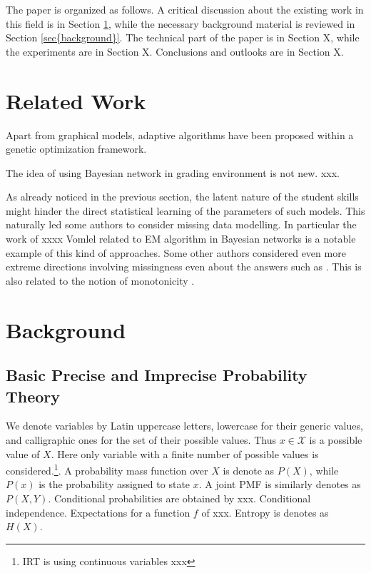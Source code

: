 \documentclass[runningheads]{llncs}
\begin{document}
The paper is organized as follows. A critical discussion about the existing work in this field is in Section \ref{sec:work}, while the necessary background material is reviewed in Section \ref{sec{background}}. The technical part of the paper is in Section X, while the experiments are in Section X. Conclusions and outlooks are in Section X.

\section{Related Work}\label{sec:work}






Apart from graphical models, adaptive algorithms have been proposed within a genetic optimization framework.


The idea of using Bayesian network in grading environment is not new. xxx.

As already noticed in the previous section, the latent nature of the student skills might hinder the direct statistical learning of the parameters of such models. This naturally led some authors to consider missing data modelling. In particular the work of xxxx Vomlel related to EM algorithm in Bayesian networks is a notable example of this kind of approaches. Some other authors considered even more extreme directions involving missingness even about the answers such as \cite{bachrach2012grade}.
This is also related to the notion of monotonicity \cite{plajner2020monotonicity}.


\section{Background}
\subsection*{Basic Precise and Imprecise Probability Theory}
We denote variables by Latin uppercase letters, lowercase for their generic values, and calligraphic ones for the set of their possible values. Thus $x \in \mathcal{X}$ is a possible value of $X$. Here only variable with a finite number of possible values is considered.\footnote{IRT is using continuous variables xxx}. A probability mass function over $X$ is denote as $P(X)$, while $P(x)$ is the probability assigned to state $x$. A joint PMF is similarly denotes as $P(X,Y)$. Conditional probabilities are obtained by xxx. Conditional independence. Expectations for a function $f$ of xxx. Entropy is denotes as $H(X)$. 
\end{document}
